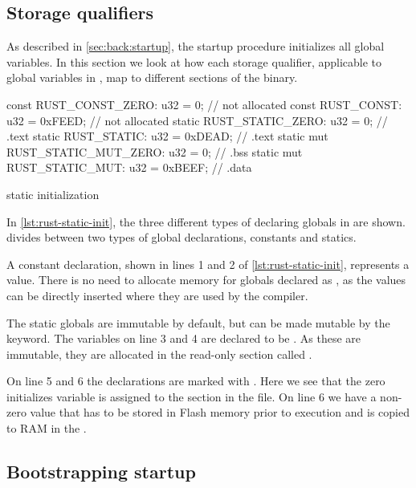 \subsection{Storage qualifiers}

As described in \autoref{sec:back:startup}, the startup procedure initializes all global variables.
In this section we look at how each storage qualifier,  applicable to global variables in {\rust}, map to different sections of the {\elf} binary.

\begin{listing}[H]
\begin{rustcode}
const      RUST_CONST_ZERO: u32 = 0;      // not allocated
const      RUST_CONST: u32 = 0xFEED;      // not allocated
static     RUST_STATIC_ZERO: u32 = 0;     // .text
static     RUST_STATIC: u32 = 0xDEAD;     // .text
static mut RUST_STATIC_MUT_ZERO: u32 = 0; // .bss
static mut RUST_STATIC_MUT: u32 = 0xBEEF; // .data
\end{rustcode}
\caption{{\rust} static initialization}
\label{lst:rust-static-init}
\end{listing}

In \autoref{lst:rust-static-init}, the three different types of declaring globals in {\rust} are shown.
{\rust} divides between two types of global declarations, constants and statics.

A constant declaration, shown in lines 1 and 2 of \autoref{lst:rust-static-init}, represents a value.
There is no need to allocate memory for globals declared as , as the values can be directly inserted where they are used by the compiler.

The static globals are immutable by default, but can be made mutable by the  keyword.
The variables on line 3 and 4 are declared to be .
As these are immutable, they are allocated in the read-only section called .

On line 5 and 6 the declarations are marked with .
Here we see that the zero initializes variable is assigned to the  section in the {\elf} file.
On line 6 we have a non-zero value that has to be stored in Flash memory prior to execution and is copied to RAM in the .

\subsection{Bootstrapping startup}
\label{sec:startup}

